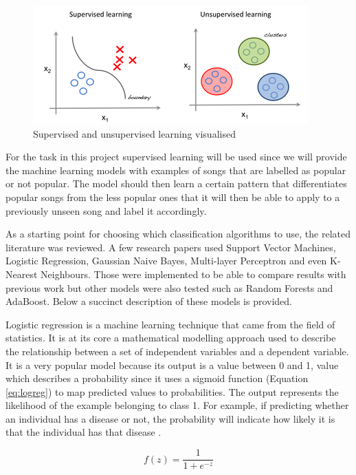 \begin{figure}[h]
\centering
\includegraphics[width=0.9\linewidth]{background/fig/graph.png}
\caption{Supervised and unsupervised learning visualised \cite{SupervisedUnsupervised:online}}
\label{fig:supunsup}
\end{figure}

For the task in this project supervised learning will be used since we will provide the machine learning models with examples of songs that are labelled as popular or not popular. The model should then learn a certain pattern that differentiates popular songs from the less popular ones that it will then be able to apply to a previously unseen song and label it accordingly. 

As a starting point for choosing which classification algorithms to use, the related literature was reviewed. A few research papers used Support Vector Machines, Logistic Regression, Gaussian Naive Bayes, Multi-layer Perceptron and even K-Nearest Neighbours. Those were implemented to be able to compare results with previous work but other models were also tested such as Random Forests and AdaBoost. Below a succinct description of these models is provided.

Logistic regression is a machine learning technique that came from the field of statistics. It is at its core a mathematical modelling approach used to describe the relationship between a set of independent variables and a dependent variable. It is a very popular model because its output is a value between 0 and 1, value which describes a probability since it uses a sigmoid function (Equation \ref{eq:logreg}) to map predicted values to probabilities. The output represents the likelihood of the example belonging to class 1. For example, if predicting whether an individual has a disease or not, the probability will indicate how likely it is that the individual has that disease \cite{kleinbaum2002logistic}.

\begin{equation}
f(z)=\frac{1}{1+e^{-z}}
\label{eq:logreg}
\end{equation}

